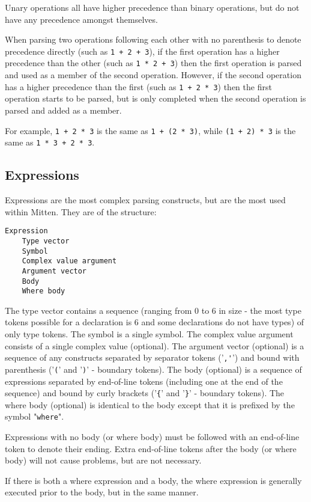 \documentclass[10pt,a4paper]{article}
\begin{document}
Unary operations all have higher precedence than binary operations, but do not have any precedence amongst themselves.

When parsing two operations following each other with no parenthesis to denote precedence directly (such as \verb|1 + 2 + 3|), if the first operation has a higher precedence than the other (such as \verb|1 * 2 + 3|) then the first operation is parsed and used as a member of the second operation. However, if the second operation has a higher precedence than the first (such as \verb|1 + 2 * 3|) then the first operation starts to be parsed, but is only completed when the second operation is parsed and added as a member.

For example, \verb|1 + 2 * 3| is the same as \verb|1 + (2 * 3)|, while \verb|(1 + 2) * 3| is the same as \verb|1 * 3 + 2 * 3|.

\subsection{Expressions}
\label{sec:expressions}
Expressions are the most complex parsing constructs, but are the most used within Mitten. They are of the structure:
\begin{verbatim}
Expression
    Type vector
    Symbol
    Complex value argument
    Argument vector
    Body
    Where body
\end{verbatim}

The type vector contains a sequence (ranging from 0 to 6 in size - the most type tokens possible for a declaration is 6 and some declarations do not have types) of only type tokens. The symbol is a single symbol. The complex value argument consists of a single complex value (optional). The argument vector (optional) is a sequence of any constructs separated by separator tokens ('\verb|,'|') and bound with parenthesis ('\verb|(|' and '\verb|)|' - boundary tokens). The body (optional) is a sequence of expressions separated by end-of-line tokens (including one at the end of the sequence) and bound by curly brackets ('\verb|{|' and '\verb|}|' - boundary tokens). The where body (optional) is identical to the body except that it is prefixed by the symbol "\verb|where|".

Expressions with no body (or where body) must be followed with an end-of-line token to denote their ending. Extra end-of-line tokens after the body (or where body) will not cause problems, but are not necessary. 

If there is both a where expression and a body, the where expression is generally executed prior to the body, but in the same manner. 
\end{document}
